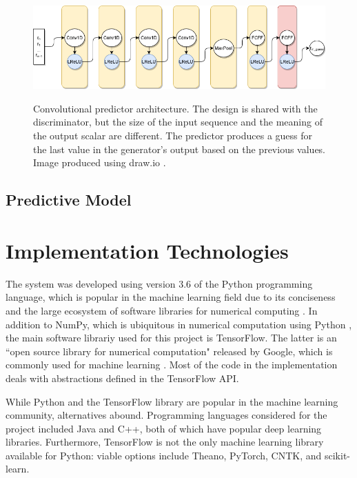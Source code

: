 \documentclass[12pt, titlepage]{report}
\theoremstyle{definition}
\begin{document}
\begin{figure}
\centering
\includegraphics[width=1\textwidth]{img/predictor.png}\\
\caption{Convolutional predictor architecture. The design is shared with the discriminator, but the size of the input sequence and the meaning of the output scalar are different. The predictor produces a guess for the last value in the generator's output based on the previous values. Image produced using draw.io \cite{jgraph2018draw}.}
\label{figure:architecture_conv}
\end{figure}



\subsection{Predictive Model}



\section{Implementation Technologies}
The system was developed using version 3.6 of the Python programming language, which is popular in the machine learning field due to its conciseness and the large ecosystem of software libraries for numerical computing \cite{numpy}. In addition to NumPy, which is ubiquitous in numerical computation using Python \cite{numpy}, the main software librariy used for this project is TensorFlow. The latter is an ``open source library for numerical computation" released by Google, which is commonly used for machine learning \cite{tensorflow}. Most of the code in the implementation deals with abstractions defined in the TensorFlow API.

While Python and the TensorFlow library are popular in the machine learning community, alternatives abound. Programming languages considered for the project included Java and C++, both of which have popular deep learning libraries. Furthermore, TensorFlow is not the only machine learning library available for Python: viable options include Theano, PyTorch, CNTK, and scikit-learn.
\end{document}
